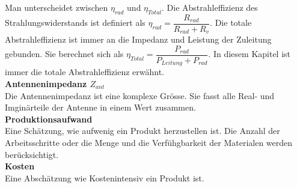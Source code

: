 Man unterscheidet zwischen $\eta_{rad}$ und $\eta_{Total}$. Die Abstrahleffizienz des Strahlungswiderstands ist definiert als $\eta_{rad}=\dfrac{R_{rad}}{R_{rad}+R_v}$. Die totale Abstrahleffizienz ist immer an die Impedanz und Leistung der Zuleitung gebunden. Sie berechnet sich als $\eta_{Total}=\dfrac{P_{rad}}{P_{Leitung}+P_{rad}}$. In diesem Kapitel ist immer die totale Abstrahleffizienz erwähnt.\\
\textbf{Antennenimpedanz $Z_{ant}$}\\
Die Antennenimpedanz ist eine komplexe Grösse. Sie fasst alle Real- und Imginärteile der Antenne in einem Wert zusammen.\\
\textbf{Produktionsaufwand}\\
Eine Schätzung, wie aufwenig ein Produkt herzustellen ist. Die Anzahl der Arbeitsschritte oder die Menge und die Verfühgbarkeit der Materialen werden berücksichtigt.\\
\textbf{Kosten}\\
Eine Abschätzung wie Kostenintensiv ein Produkt ist.
\newpage 
\thispagestyle{empty}

